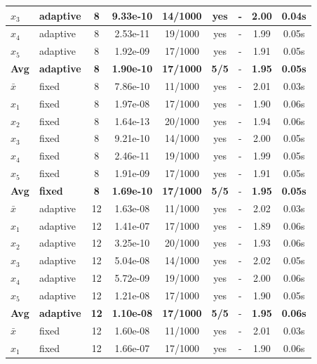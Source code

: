 \begin{longtable}{|l|l|c|c|c|c|c|c|c|}
\hline
$x_3$ & adaptive & 8 & 9.33e-10 & 14/1000 & yes & - & 2.00 & 0.04s \\
\hline
$x_4$ & adaptive & 8 & 2.53e-11 & 19/1000 & yes & - & 1.99 & 0.05s \\
\hline
$x_5$ & adaptive & 8 & 1.92e-09 & 17/1000 & yes & - & 1.91 & 0.05s \\
\hline
\hline\hline
\textbf{Avg} & \textbf{adaptive} & \textbf{8} & \textbf{1.90e-10} & \textbf{17/1000} & \textbf{5/5} & - & \textbf{1.95} & \textbf{0.05s} \\
\hline\hline
\hline
$\bar{x}$ & fixed & 8 & 7.86e-10 & 11/1000 & yes & - & 2.01 & 0.03s \\
\hline
$x_1$ & fixed & 8 & 1.97e-08 & 17/1000 & yes & - & 1.90 & 0.06s \\
\hline
$x_2$ & fixed & 8 & 1.64e-13 & 20/1000 & yes & - & 1.94 & 0.06s \\
\hline
$x_3$ & fixed & 8 & 9.21e-10 & 14/1000 & yes & - & 2.00 & 0.05s \\
\hline
$x_4$ & fixed & 8 & 2.46e-11 & 19/1000 & yes & - & 1.99 & 0.05s \\
\hline
$x_5$ & fixed & 8 & 1.91e-09 & 17/1000 & yes & - & 1.91 & 0.05s \\
\hline
\hline\hline
\textbf{Avg} & \textbf{fixed} & \textbf{8} & \textbf{1.69e-10} & \textbf{17/1000} & \textbf{5/5} & - & \textbf{1.95} & \textbf{0.05s} \\
\hline\hline
$\bar{x}$ & adaptive & 12 & 1.63e-08 & 11/1000 & yes & - & 2.02 & 0.03s \\
\hline
$x_1$ & adaptive & 12 & 1.41e-07 & 17/1000 & yes & - & 1.89 & 0.06s \\
\hline
$x_2$ & adaptive & 12 & 3.25e-10 & 20/1000 & yes & - & 1.93 & 0.06s \\
\hline
$x_3$ & adaptive & 12 & 5.04e-08 & 14/1000 & yes & - & 2.02 & 0.05s \\
\hline
$x_4$ & adaptive & 12 & 5.72e-09 & 19/1000 & yes & - & 2.00 & 0.06s \\
\hline
$x_5$ & adaptive & 12 & 1.21e-08 & 17/1000 & yes & - & 1.90 & 0.05s \\
\hline
\hline\hline
\textbf{Avg} & \textbf{adaptive} & \textbf{12} & \textbf{1.10e-08} & \textbf{17/1000} & \textbf{5/5} & - & \textbf{1.95} & \textbf{0.06s} \\
\hline\hline
\hline
$\bar{x}$ & fixed & 12 & 1.60e-08 & 11/1000 & yes & - & 2.01 & 0.03s \\
\hline
$x_1$ & fixed & 12 & 1.66e-07 & 17/1000 & yes & - & 1.90 & 0.06s \\

\end{longtable}

